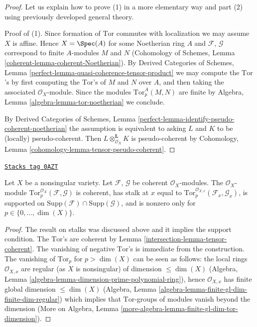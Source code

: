 \begin{proof}
Let us explain how to prove (1) in a more elementary way and part (2)
using previously developed general theory.

\medskip\noindent
Proof of (1). Since formation of $\text{Tor}$ commutes with localization
we may assume $X$ is affine. Hence $X = \Spec(A)$ for some Noetherian
ring $A$ and $\mathcal{F}$, $\mathcal{G}$ correspond to finite $A$-modules
$M$ and $N$ (Cohomology of Schemes, Lemma
\ref{coherent-lemma-coherent-Noetherian}).
By Derived Categories of Schemes, Lemma
\ref{perfect-lemma-quasi-coherence-tensor-product} we may
compute the $\text{Tor}$'s by first computing the $\text{Tor}$'s
of $M$ and $N$ over $A$, and then taking the associated $\mathcal{O}_X$-module.
Since the modules $\text{Tor}_p^A(M, N)$ are finite by
Algebra, Lemma \ref{algebra-lemma-tor-noetherian}
we conclude.

\medskip\noindent
By Derived Categories of Schemes, Lemma
\ref{perfect-lemma-identify-pseudo-coherent-noetherian}
the assumption is equivalent to asking $L$ and $K$ to be
(locally) pseudo-coherent. Then $L \otimes_{\mathcal{O}_X}^\mathbf{L} K$
is pseudo-coherent by
Cohomology, Lemma \ref{cohomology-lemma-tensor-pseudo-coherent}.
\end{proof}

\begin{lemma}
\label{intersection-lemma-compute-tor-nonsingular}
\href{https://stacks.math.columbia.edu/tag/0AZT}{\texttt{Stacks tag 0AZT}}

Let $X$ be a nonsingular variety.
Let $\mathcal{F}$, $\mathcal{G}$ be coherent $\mathcal{O}_X$-modules.
The $\mathcal{O}_X$-module
$\text{Tor}_p^{\mathcal{O}_X}(\mathcal{F}, \mathcal{G})$
is coherent, has stalk at $x$ equal to
$\text{Tor}_p^{\mathcal{O}_{X, x}}(\mathcal{F}_x, \mathcal{G}_x)$,
is supported on
$\text{Supp}(\mathcal{F}) \cap \text{Supp}(\mathcal{G})$, and
is nonzero only for $p \in \{0, \ldots, \dim(X)\}$.
\end{lemma}

\begin{proof}

The result on stalks was discussed above and it implies the support
condition. The $\text{Tor}$'s are coherent by
Lemma \ref{intersection-lemma-tensor-coherent}. The vanishing of negative
$\text{Tor}$'s is immediate from the construction. The
vanishing of $\text{Tor}_p$ for $p > \dim(X)$ can be seen as follows:
the local rings $\mathcal{O}_{X, x}$ are regular
(as $X$ is nonsingular) of dimension $\leq \dim(X)$
(Algebra, Lemma \ref{algebra-lemma-dimension-prime-polynomial-ring}),
hence $\mathcal{O}_{X, x}$ has finite global dimension $\leq \dim(X)$
(Algebra, Lemma \ref{algebra-lemma-finite-gl-dim-finite-dim-regular})
which implies that $\text{Tor}$-groups of modules vanish beyond the dimension
(More on Algebra, Lemma \ref{more-algebra-lemma-finite-gl-dim-tor-dimension}).
\end{proof}

